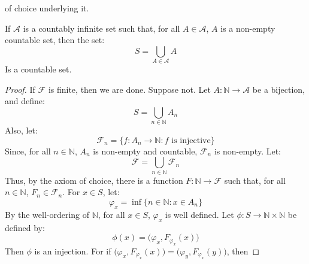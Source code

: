         of choice underlying it.
        \begin{theorem}
            If $\mathcal{A}$ is a countably infinite set
            such that, for all $A\in\mathcal{A}$, $A$ is
            a non-empty countable set, then the set:
            \begin{equation}
                S=\bigcup_{A\in\mathcal{A}}A
            \end{equation}
            Is a countable set.
        \end{theorem}
        \begin{proof}
            If $\mathcal{F}$ is finite, then we are done. Suppose not.
            Let $A:\mathbb{N}\rightarrow\mathcal{A}$ be a bijection,
            and define:
            \begin{equation}
                S=\bigcup_{n\in\mathbb{N}}A_{n}
            \end{equation}
            Also, let:
            \begin{equation}
                \mathcal{F}_{n}
                =\{f:A_{n}\rightarrow\mathbb{N}:
                    f\textrm{ is injective}\}
            \end{equation}
            Since, for all $n\in\mathbb{N}$, $A_{n}$ is
            non-empty and countable, $\mathcal{F}_{n}$
            is non-empty. Let:
            \begin{equation}
                \mathcal{F}
                =\bigcup_{n\in\mathbb{N}}\mathcal{F}_{n}
            \end{equation}
            Thus, by the axiom of choice, there is a function
            $F:\mathbb{N}\rightarrow\mathcal{F}$ such that, for all
            $n\in\mathbb{N}$, $F_{n}\in\mathcal{F}_{n}$. For
            $x\in{S}$, let:
            \begin{equation}
                \varphi_{x}
                =\inf\{n\in\mathbb{N}:x\in{A}_{n}\}
            \end{equation}
            By the well-ordering of $\mathbb{N}$, for all
            $x\in{S}$, $\varphi_{x}$ is well defined. Let
            $\phi:S\rightarrow\mathbb{N}\times\mathbb{N}$
            be defined by:
            \begin{equation}
                \phi(x)
                =\big(\varphi_{x},F_{\varphi_{x}}(x)\big)
            \end{equation}
            Then $\phi$ is an injection. For if
            $\big(\varphi_{x},F_{\varphi_{x}}(x)\big)=%
             \big(\varphi_{y},F_{\varphi_{x}}(y)\big)$, then

\end{proof}
